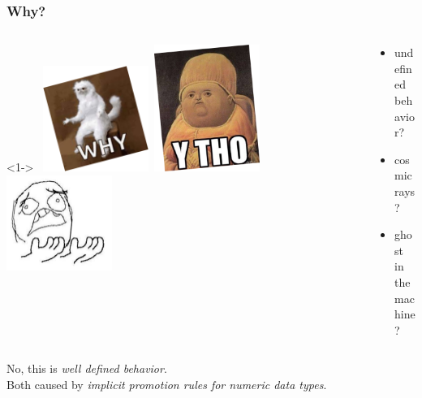 \documentclass[aspectratio=169]{beamer}
\newcommand{\greenemph}[1]{\textit{\textcolor{clGreen}{#1}}}
\begin{document}
\begin{frame}[fragile]
\frametitle{Why?}
\begin{columns}[T]
  \begin{column}{0.7\textwidth}<1->
    \vspace*{-30pt}\
    \includegraphics[width=0.3\textwidth]{pictures/why1.png}\
    \includegraphics[width=0.3\textwidth]{pictures/why3.png}\
    \includegraphics[width=0.3\textwidth]{pictures/why2.png}\
  \end{column}
  \begin{column}{0.35\textwidth}
    \begin{itemize}
      \item{} undefined behavior?
      \item{} cosmic rays?
      \item{} ghost in the machine?
    \end{itemize}
  \end{column}
\end{columns}
\pause{}
\vspace{24pt}
\begin{center}
No, this is \greenemph{well defined behavior}.\\
Both caused by \emph{implicit promotion rules for numeric data types}.
\end{center}
\end{frame}
\end{document}
